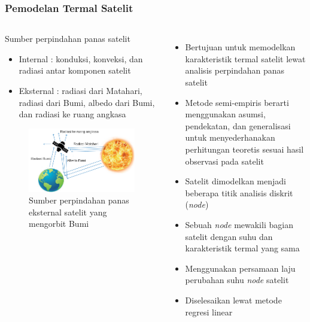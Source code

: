 \documentclass[8pt]{beamer}
\begin{document}
\begin{frame}
  \frametitle{Pemodelan Termal Satelit}
  \begin{columns}[T]
    \begin{block}{\center Sumber perpindahan panas satelit}
      \begin{itemize}
        \item Internal : konduksi, konveksi, dan radiasi antar komponen satelit
        \item Eksternal : radiasi dari Matahari, radiasi dari Bumi, albedo dari Bumi, dan radiasi ke ruang angkasa
      \end{itemize}
      \begin{figure}
        \includegraphics[width=1.0\textwidth]{figure/external_source.png}
        Sumber perpindahan panas eksternal satelit yang mengorbit Bumi \cite{abdelkhalek2019}
      \end{figure}
    \end{block}
    \begin{itemize}
      \item Bertujuan untuk memodelkan karakteristik termal satelit lewat analisis perpindahan panas satelit
      \item Metode semi-empiris berarti menggunakan asumsi, pendekatan, dan generalisasi untuk menyederhanakan perhitungan teoretis sesuai hasil observasi pada satelit
      \item Satelit dimodelkan menjadi beberapa titik analisis diskrit (\textit{node})
      \item Sebuah \textit{node} mewakili bagian satelit dengan suhu dan karakteristik termal yang sama
      \item Menggunakan persamaan laju perubahan suhu \textit{node} satelit
      \item Diselesaikan lewat metode regresi linear
    \end{itemize}
  \end{columns}
\end{frame}
\end{document}
